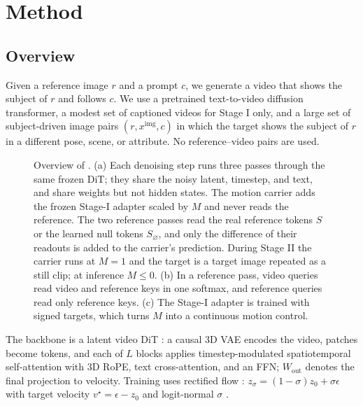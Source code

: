 \section{Method}
\label{sec:method}

\subsection{Overview}
\label{sec:3_1}

Given a reference image $r$ and a prompt $c$, we generate a video that shows the subject of $r$ and follows $c$. We use a pretrained text-to-video diffusion transformer, a modest set of captioned videos for Stage I only, and a large set of subject-driven image pairs $(r, x^{\mathrm{img}}, c)$ in which the target shows the subject of $r$ in a different pose, scene, or attribute. No reference--video pairs are used.

\begin{figure}[t]
  \centering
  
  \caption{Overview of \method{}. (a) Each denoising step runs three passes through the same frozen DiT; they share the noisy latent, timestep, and text, and share weights but not hidden states. The motion carrier adds the frozen Stage-I adapter scaled by $M$ and never reads the reference. The two reference passes read the real reference tokens $S$ or the learned null tokens $S_\varnothing$, and only the difference of their readouts is added to the carrier's prediction. During Stage II the carrier runs at $M{=}1$ and the target is a target image repeated as a still clip; at inference $M{\le}0$. (b) In a reference pass, video queries read video and reference keys in one softmax, and reference queries read only reference keys. (c) The Stage-I adapter is trained with signed targets, which turns $M$ into a continuous motion control.}
  \label{fig:overview}
\end{figure}

The backbone is a latent video DiT \cite{wan2025, peebles2023dit}: a causal 3D VAE encodes the video, patches become tokens, and each of $L$ blocks applies timestep-modulated spatiotemporal self-attention with 3D RoPE, text cross-attention, and an FFN; $W_{\mathrm{out}}$ denotes the final projection to velocity. Training uses rectified flow \cite{liu2022rectified, lipman2022flow}: $z_\sigma = (1-\sigma) z_0 + \sigma\epsilon$ with target velocity $v^\star = \epsilon - z_0$ and logit-normal $\sigma$ \cite{esser2024sd3}.

